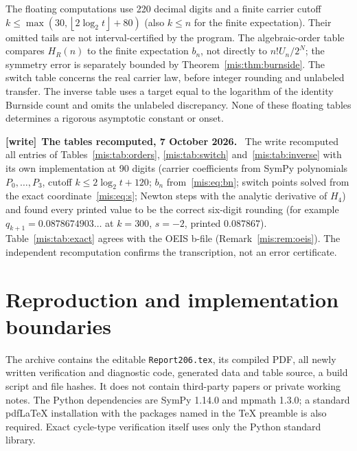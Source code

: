 \documentclass[11pt]{article}
\theoremstyle{remark}\newtheorem{remark}[theorem]{Remark}
\newcommand{\floor}[1]{\left\lfloor #1\right\rfloor}
\newenvironment{writenote}[1][]{\par\smallskip\begingroup\small
 \noindent\textbf{[write]}\if\relax\detokenize{#1}\relax\else~\textbf{#1.}\fi\ }%
 {\par\endgroup\smallskip}
\begin{document}
The floating computations use 220 decimal digits and a finite carrier cutoff $k\le\max(30,\floor{2\log_2t}+80)$ (also $k\le n$ for the finite expectation). Their omitted tails are not interval-certified by the program. The algebraic-order table compares $H_R(n)$ to the finite expectation $b_n$, not directly to $n!U_n/2^N$; the symmetry error is separately bounded by Theorem~\ref{mis:thm:burnside}. The switch table concerns the real carrier law, before integer rounding and unlabeled transfer. The inverse table uses a target equal to the logarithm of the identity Burnside count and omits the unlabeled discrepancy. None of these floating tables determines a rigorous asymptotic constant or onset.
\begin{writenote}[The tables recomputed, 7 October 2026]
The write recomputed all entries of Tables~\ref{mis:tab:orders},
\ref{mis:tab:switch} and~\ref{mis:tab:inverse} with its own implementation at
90 digits (carrier coefficients from SymPy polynomials $P_0,\ldots,P_3$, cutoff
$k\le2\log_2t+120$; $b_n$ from~\eqref{mis:eq:bn}; switch points solved from the
exact coordinate~\eqref{mis:eq:s}; Newton steps with the analytic derivative of
$H_4$) and found every printed value to be the correct six-digit rounding (for
example $q_{k+1}=0.0878674903\ldots$ at $k=300$, $s=-2$, printed $0.087867$).
Table~\ref{mis:tab:exact} agrees with the OEIS b-file
(Remark~\ref{mis:rem:oeis}). The independent recomputation confirms the
transcription, not an error certificate.
\end{writenote}

\section{Reproduction and implementation boundaries}
The archive contains the editable \texttt{Report206.tex}, its compiled PDF, all newly written verification and diagnostic code, generated data and table source, a build script and file hashes. It does not contain third-party papers or private working notes. The Python dependencies are SymPy 1.14.0 and mpmath 1.3.0; a standard pdfLaTeX installation with the packages named in the TeX preamble is also required. Exact cycle-type verification itself uses only the Python standard library.
\end{document}
